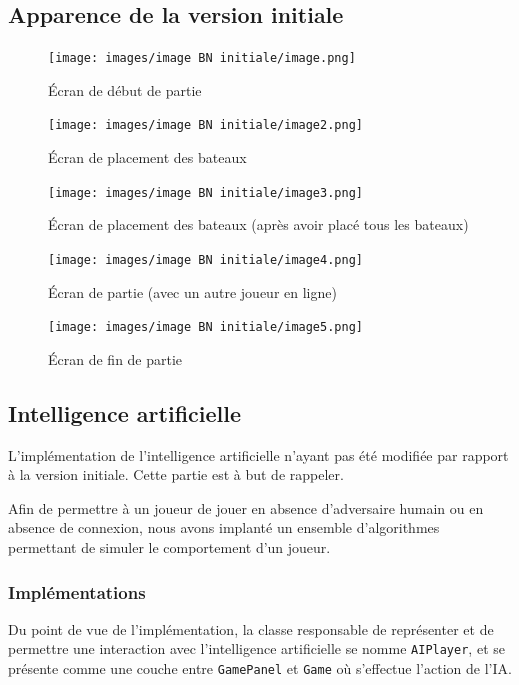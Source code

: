 \documentclass[12pt]{article}
\begin{document}
\subsection{Apparence de la version initiale}

\begin{figure}[H]
      \centering
      \texttt{[image: images/image BN
            initiale/image.png]}
      \caption{Écran de début de partie}
\end{figure}
\begin{figure}[H]
      \texttt{[image: images/image BN
            initiale/image2.png]}
      \caption{Écran de placement des bateaux}
      \endminipage\hfill
      \texttt{[image: images/image BN
            initiale/image3.png]}
      \caption{Écran de placement des bateaux (après avoir placé tous les
            bateaux)}
      \endminipage\hfill
\end{figure}

\begin{figure}[H]
      \texttt{[image: images/image BN
            initiale/image4.png]}
      \caption{Écran de partie (avec un autre joueur en
            ligne)}
      \endminipage\hfill
      \texttt{[image: images/image BN
            initiale/image5.png]}
      \caption{Écran de fin de partie}
      \endminipage\hfill
\end{figure}

\subsection{Intelligence artificielle}

L'implémentation de l'intelligence artificielle n'ayant pas été modifiée par
rapport à la version initiale. Cette partie est à but de rappeler.

Afin de permettre à un joueur de jouer en absence d'adversaire humain ou en
absence de connexion, nous avons implanté un ensemble d'algorithmes permettant
de simuler le comportement d'un joueur.
\subsubsection{Implémentations}
Du point de vue de l'implémentation, la classe responsable de représenter et de
permettre une interaction avec l'intelligence artificielle se nomme
\texttt{AIPlayer}, et se présente comme une couche entre \texttt{GamePanel} et
\texttt{Game} où s'effectue l'action de l'IA\@.
\end{document}
